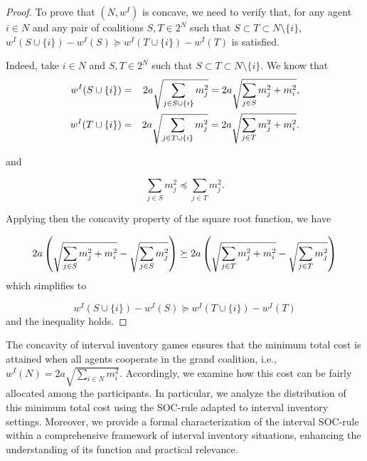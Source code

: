 \documentclass[12pt]{article}
\begin{document}
\begin{proof}
\noindent To prove that $\left(
N,w^I\right) $ is concave, we need to verify that, for any agent $i\in N$ and any pair of coalitions $S,T\in 2^{N}$ such that $S\subset T\subset
N\setminus \{i\},$  $w^I(S\cup \{i\})-w^I(S)\succeq w^I(T\cup \{i\})-w^I(T)$ is satisfied. 


Indeed, take $i\in N$ and $S,T\in 2^{N}$ such that $S\subset T\subset N\setminus \{i\}.$ We know that 
\begin{eqnarray*}
w^I(S\cup \{i\}) &=&2a\sqrt{\sum_{j\in S\cup \{i\}}m_{j}^{2}}=2a\sqrt{%
\sum_{j\in S}m_{j}^{2}+m_{i}^{2}}, \\
w^I(T\cup \{i\}) &=&2a\sqrt{\sum_{j\in T\cup \{i\}}m_{j}^{2}}=2a\sqrt{%
\sum_{j\in T}m_{j}^{2}+m_{i}^{2}}.
\end{eqnarray*}

\noindent and 

\begin{equation*}
\sum_{j\in S}m_{j}^{2}\preceq \sum_{j\in T}m_{j}^{2}.
\end{equation*}

\noindent Applying then the concavity property of the square root function, we have  

\begin{equation*}
2a\left( \sqrt{\sum_{j\in S}m_{j}^{2}+m_{i}^{2}}-\sqrt{\sum_{j\in S}m_{j}^{2}%
}\right) \succeq 2a\left( \sqrt{\sum_{j\in T}m_{j}^{2}+m_{i}^{2}}-\sqrt{%
\sum_{j\in T}m_{j}^{2}}\right)
\end{equation*}%
\noindent which simplifies to 

\begin{equation*}
w^I(S\cup \{i\})-w^I(S)\succeq w^I(T\cup \{i\})-w^I(T)
\end{equation*}%
\noindent and the inequality holds.  
\end{proof}

The concavity of interval inventory games ensures that the minimum total cost is attained when all agents cooperate in the grand coalition, i.e., 
$w^I(N)=2a\sqrt{\sum_{i\in N}m_{i}^{2}}$. Accordingly, we examine how this cost can be fairly allocated among the participants. In particular, we analyze the distribution of this minimum total cost using the SOC-rule adapted to interval inventory settings. Moreover, we provide a formal characterization of the interval SOC-rule within a comprehensive framework of interval inventory situations, enhancing the understanding of its function and practical relevance.
\end{document}
